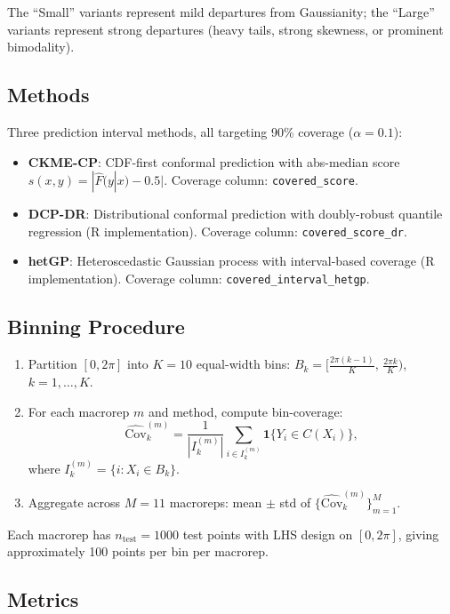 \documentclass[11pt]{article}
\theoremstyle{remark}
\begin{document}
\medskip
\noindent
The ``Small'' variants represent mild departures from Gaussianity;
the ``Large'' variants represent strong departures (heavy tails,
strong skewness, or prominent bimodality).

\subsection{Methods}

Three prediction interval methods, all targeting 90\% coverage
($\alpha=0.1$):

\begin{itemize}
  \item \textbf{CKME-CP}: CDF-first conformal prediction with
    abs-median score $s(x,y) = |\hat F(y|x) - 0.5|$.
    Coverage column: \texttt{covered\_score}.
  \item \textbf{DCP-DR}: Distributional conformal prediction with
    doubly-robust quantile regression (R implementation).
    Coverage column: \texttt{covered\_score\_dr}.
  \item \textbf{hetGP}: Heteroscedastic Gaussian process with
    interval-based coverage (R implementation).
    Coverage column: \texttt{covered\_interval\_hetgp}.
\end{itemize}

\subsection{Binning Procedure}

\begin{enumerate}
  \item Partition $[0, 2\pi]$ into $K=10$ equal-width bins:
    $B_k = [\tfrac{2\pi(k-1)}{K},\, \tfrac{2\pi k}{K})$,
    $k=1,\ldots,K$.
  \item For each macrorep $m$ and method, compute bin-coverage:
    \[
      \widehat{\mathrm{Cov}}_k^{(m)}
      = \frac{1}{|I_k^{(m)}|}
        \sum_{i \in I_k^{(m)}} \mathbf{1}\{Y_i \in C(X_i)\},
    \]
    where $I_k^{(m)} = \{i : X_i \in B_k\}$.
  \item Aggregate across $M=11$ macroreps:
    mean $\pm$ std of $\{\widehat{\mathrm{Cov}}_k^{(m)}\}_{m=1}^{M}$.
\end{enumerate}

Each macrorep has $n_{\mathrm{test}} = 1000$ test points with LHS
design on $[0, 2\pi]$, giving approximately 100 points per bin per
macrorep.

\subsection{Metrics}
\end{document}
